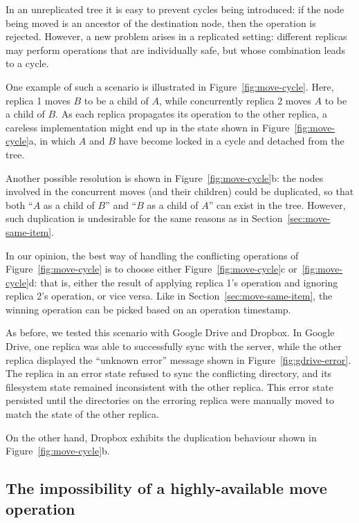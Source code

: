 \documentclass[sigconf]{acmart}
\begin{document}
In an unreplicated tree it is easy to prevent cycles being introduced: if the node being moved is an ancestor of the destination node, then the operation is rejected.
However, a new problem arises in a replicated setting: different replicas may perform operations that are individually safe, but whose combination leads to a cycle.

One example of such a scenario is illustrated in Figure~\ref{fig:move-cycle}.
Here, replica 1 moves $B$ to be a child of $A$, while concurrently replica 2 moves $A$ to be a child of $B$.
As each replica propagates its operation to the other replica, a careless implementation might end up in the state shown in Figure~\ref{fig:move-cycle}a, in which $A$ and $B$ have become locked in a cycle and detached from the tree.

Another possible resolution is shown in Figure~\ref{fig:move-cycle}b: the nodes involved in the concurrent moves (and their children) could be duplicated, so that both ``$A$ as a child of $B$'' and ``$B$ as a child of $A$'' can exist in the tree.
However, such duplication is undesirable for the same reasons as in Section~\ref{sec:move-same-item}.

In our opinion, the best way of handling the conflicting operations of Figure~\ref{fig:move-cycle} is to choose either Figure~\ref{fig:move-cycle}c or~\ref{fig:move-cycle}d: that is, either the result of applying replica 1's operation and ignoring replica 2's operation, or vice versa.
Like in Section~\ref{sec:move-same-item}, the winning operation can be picked based on an operation timestamp.

As before, we tested this scenario with Google Drive and Dropbox.
In Google Drive, one replica was able to successfully sync with the server, while the other replica displayed the ``unknown error'' message shown in Figure~\ref{fig:gdrive-error}.
The replica in an error state refused to sync the conflicting directory, and its filesystem state remained inconsistent with the other replica.
This error state persisted until the directories on the erroring replica were manually moved to match the state of the other replica.

On the other hand, Dropbox exhibits the duplication behaviour shown in Figure~\ref{fig:move-cycle}b.

\subsection{The impossibility of a highly-available move operation}\label{sec:impossibility}
\end{document}
